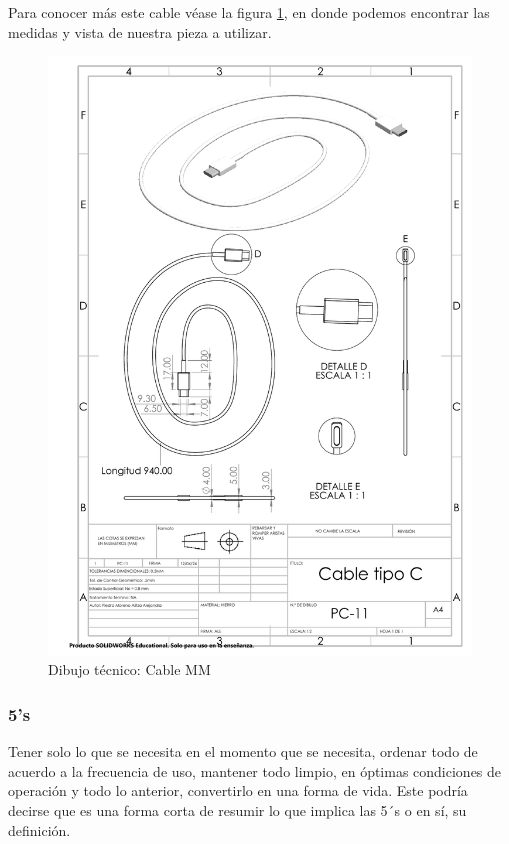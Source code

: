     Para conocer más este cable véase la figura \ref{fig:cableC}, en donde podemos encontrar las medidas y vista de nuestra pieza a utilizar. 
    
    \begin{figure}[H]
        \centering
        \includegraphics[trim = {7mm 1mm 1mm 1mm},clip,scale=0.4]{22/Img/cableCDibujo.PDF}
        \caption{Dibujo técnico: Cable MM}
        \label{fig:cableC}
    \end{figure}
    
    
    
    \subsubsection{5's}
    
    Tener solo lo que se necesita en el momento que se necesita, ordenar todo de acuerdo a la frecuencia de uso, mantener todo limpio,  en óptimas condiciones de operación y todo lo anterior, convertirlo en una forma de vida. Este podría decirse que es una forma corta de resumir lo que implica las 5´s o en sí, su definición.
    
